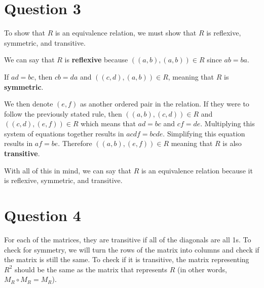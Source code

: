 \documentclass[letterpaper, 12pt]{article}
\begin{document}
\section*{Question 3}
To show that $R$ is an equivalence relation, we must show that $R$ is reflexive, symmetric, and transitive.

We can say that $R$ is \textbf{reflexive} because $((a,b), (a,b)) \in R$ since $ab = ba$. 

If $ad = bc$, then $cb = da$ and $((c,d), (a,b)) \in R$, meaning that $R$ is \textbf{symmetric}.

We then denote $(e,f)$ as another ordered pair in the relation. If they were to follow the previously stated rule, then $((a,b), (c,d)) \in R$ and $((c,d), (e,f)) \in R$ which means that $ad = bc$ and $cf = de$. Multiplying this system of equations together results in $acdf = bcde$. Simplifying this equation results in $af = be$. Therefore $((a,b), (e,f)) \in R$ meaning that $R$ is also \textbf{transitive}.

With all of this in mind, we can say that $R$ is an equivalence relation because it is reflexive, symmetric, and transitive.

\section*{Question 4}
For each of the matrices, they are transitive if all of the diagonals are all 1s. To check for symmetry, we will turn the rows of the matrix into columns and check if the matrix is still the same. To check if it is transitive, the matrix representing $R^2$ should be the same as the matrix that represents $R$ (in other words, $M_R \circ M_R = M_R$).
\end{document}
